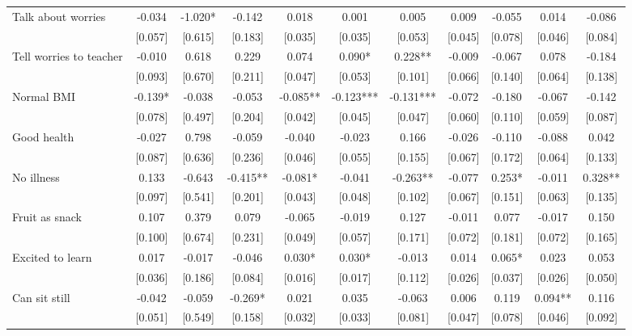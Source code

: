 \documentclass[12pt]{article}
\begin{document}
\begin{table}[ht]
\begin{center}
\begin{adjustbox}{width=1.2\textwidth,center=\textwidth}
\begin{tabular}{l*{10}{c}}
Talk about worries  & -0.034 & -1.020* & -0.142 & 0.018 & 0.001 & 0.005 & 0.009 & -0.055 & 0.014 & -0.086 \\
 & [0.057] & [0.615] & [0.183] & [0.035] & [0.035] & [0.053] & [0.045] & [0.078] & [0.046] & [0.084] \\
Tell worries to teacher & -0.010 & 0.618 & 0.229 & 0.074 & 0.090* & 0.228** & -0.009 & -0.067 & 0.078 & -0.184 \\
 & [0.093] & [0.670] & [0.211] & [0.047] & [0.053] & [0.101] & [0.066] & [0.140] & [0.064] & [0.138] \\
Normal BMI & -0.139* & -0.038 & -0.053 & -0.085** & -0.123*** & -0.131*** & -0.072 & -0.180 & -0.067 & -0.142 \\
 & [0.078] & [0.497] & [0.204] & [0.042] & [0.045] & [0.047] & [0.060] & [0.110] & [0.059] & [0.087] \\
Good health & -0.027 & 0.798 & -0.059 & -0.040 & -0.023 & 0.166 & -0.026 & -0.110 & -0.088 & 0.042 \\
 & [0.087] & [0.636] & [0.236] & [0.046] & [0.055] & [0.155] & [0.067] & [0.172] & [0.064] & [0.133] \\
No illness & 0.133 & -0.643 & -0.415** & -0.081* & -0.041 & -0.263** & -0.077 & 0.253* & -0.011 & 0.328** \\
 & [0.097] & [0.541] & [0.201] & [0.043] & [0.048] & [0.102] & [0.067] & [0.151] & [0.063] & [0.135] \\
Fruit as snack & 0.107 & 0.379 & 0.079 & -0.065 & -0.019 & 0.127 & -0.011 & 0.077 & -0.017 & 0.150 \\
 & [0.100] & [0.674] & [0.231] & [0.049] & [0.057] & [0.171] & [0.072] & [0.181] & [0.072] & [0.165] \\
Excited to learn & 0.017 & -0.017 & -0.046 & 0.030* & 0.030* & -0.013 & 0.014 & 0.065* & 0.023 & 0.053 \\
 & [0.036] & [0.186] & [0.084] & [0.016] & [0.017] & [0.112] & [0.026] & [0.037] & [0.026] & [0.050] \\
Can sit still & -0.042 & -0.059 & -0.269* & 0.021 & 0.035 & -0.063 & 0.006 & 0.119 & 0.094** & 0.116 \\
 & [0.051] & [0.549] & [0.158] & [0.032] & [0.033] & [0.081] & [0.047] & [0.078] & [0.046] & [0.092] \\

\end{tabular}
\end{adjustbox}
\end{center}
\end{table}
\end{document}
